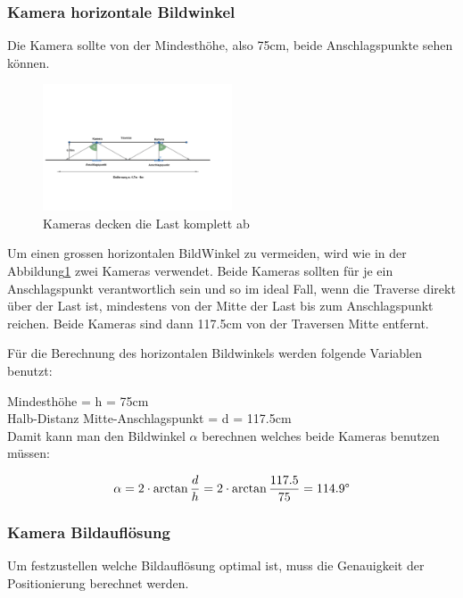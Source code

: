 \subsubsection{Kamera horizontale Bildwinkel}

Die Kamera sollte von der Mindesthöhe, also 75cm, beide Anschlagspunkte sehen können.

\begin{figure}[H]
    \centering
    \includegraphics[width=0.5\textwidth]{graphics/KameraFOV.png}\hfill%
    \caption{Kameras decken die Last komplett ab}
    \label{fig:FOV}
\end{figure}

Um einen grossen horizontalen BildWinkel zu vermeiden, wird wie in der Abbildung\ref{fig:FOV} zwei Kameras verwendet. 
Beide Kameras sollten für je ein Anschlagspunkt verantwortlich sein und so im ideal Fall, wenn die Traverse direkt über der Last ist, mindestens von der Mitte der Last bis zum Anschlagspunkt reichen.
Beide Kameras sind dann 117.5cm von der Traversen Mitte entfernt.

Für die Berechnung des horizontalen Bildwinkels werden folgende Variablen benutzt:

Mindesthöhe = h = 75cm\\
Halb-Distanz Mitte-Anschlagspunkt = d = 117.5cm\\

Damit kann man den Bildwinkel \(\alpha\) berechnen welches beide Kameras benutzen müssen:

\begin{equation}
    \alpha = 2 \cdot \arctan\frac{d}{h} = 2 \cdot \arctan\frac{117.5}{75} = 114.9\degree
    \label{eq:FOV}
\end{equation}


\subsubsection{Kamera Bildauflösung}
Um festzustellen welche Bildauflösung optimal ist, muss die Genauigkeit der Positionierung berechnet werden.

